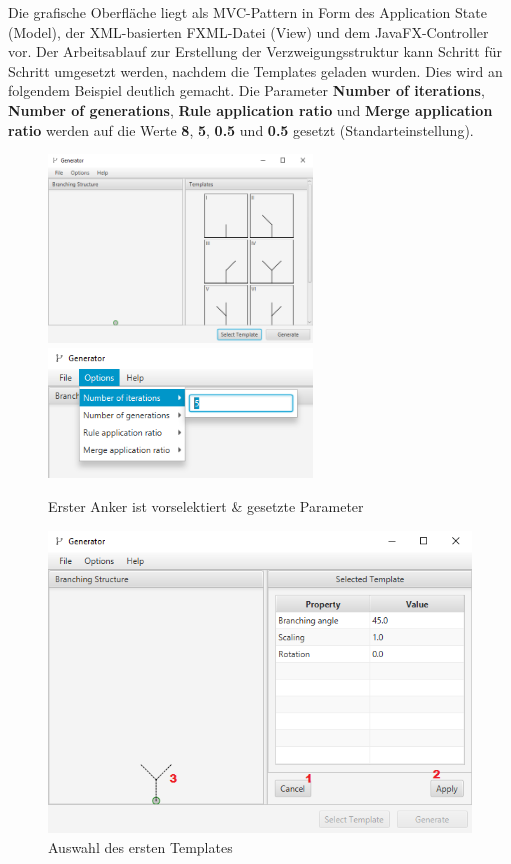 Die grafische Oberfläche liegt als MVC-Pattern in Form des Application State (Model), der XML-basierten FXML-Datei (View)
und dem JavaFX-Controller vor.
Der Arbeitsablauf zur Erstellung der Verzweigungsstruktur kann Schritt für Schritt umgesetzt werden, nachdem die Templates
geladen wurden.
Dies wird an folgendem Beispiel deutlich gemacht.
Die Parameter \textbf{Number of iterations}, \textbf{Number of generations}, \textbf{Rule application ratio} und
\textbf{Merge application ratio} werden auf die Werte \textbf{8}, \textbf{5}, \textbf{0.5} und \textbf{0.5} gesetzt
(Standarteinstellung).
\begin{figure}[H]
    \centering
    \includegraphics[width=7cm]{../images/UI_templates.png}
    \includegraphics[width=7cm]{../images/UI_parameters.png}
    \caption{Erster Anker ist vorselektiert \& gesetzte Parameter}
\end{figure}

\begin{figure}[H]
    \centering
    \includegraphics[width=12cm]{../images/UI_template.png}
    \caption{Auswahl des ersten Templates}
\end{figure}

